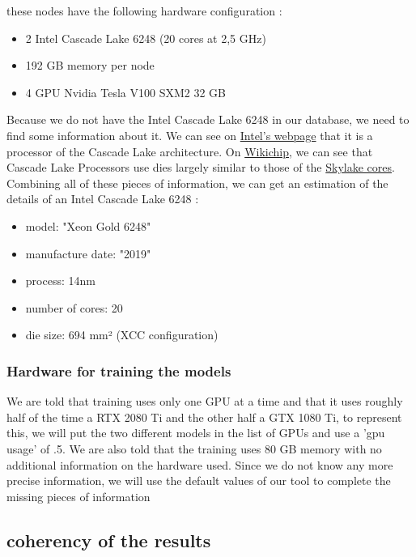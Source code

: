 \documentclass[11pt]{article}
\begin{document}
these nodes have the following hardware configuration :
\begin{itemize}
\item 2 Intel Cascade Lake 6248 (20 cores at 2,5 GHz)
\item 192 GB  memory per node
\item 4 GPU Nvidia Tesla V100 SXM2 32 GB
\end{itemize}

Because we do not have the Intel Cascade Lake 6248 in our database, we
need to find some information about it. We can see on \href{https://www.intel.fr/content/www/fr/fr/products/sku/192446/intel-xeon-gold-6248-processor-27-5m-cache-2-50-ghz/specifications.html}{Intel's webpage}
that it is a processor of the Cascade Lake architecture. On \href{https://en.wikichip.org/wiki/intel/microarchitectures/cascade\_lake\#LCC\_SoC}{Wikichip},
we can see that Cascade Lake Processors use dies largely similar to
those of the \href{https://en.wikichip.org/wiki/intel/microarchitectures/skylake\_(server)\#Core}{Skylake cores}. Combining all of these pieces of
information, we can get an estimation of the details of an Intel
Cascade Lake 6248 :
\begin{itemize}
\item model: "Xeon Gold 6248"
\item manufacture date: "2019"
\item process: 14nm
\item number of cores: 20
\item die size: 694 mm² (XCC configuration)
\end{itemize}

\subsubsection{Hardware for training the models}
\label{sec:org6a939fc}

We are told that training uses only one GPU at a time and that it uses
roughly half of the time a RTX 2080 Ti and the other half a GTX 1080
Ti, to represent this, we will put the two different models in the
list of GPUs and use a 'gpu usage' of .5.
We are also told that the training uses 80 GB memory with no
additional information on the hardware used.
Since we do not know any more precise information, we will use the
default values of our tool to complete the missing pieces of information

\subsection{coherency of the results}
\label{sec:orge2628bb}
\end{document}
